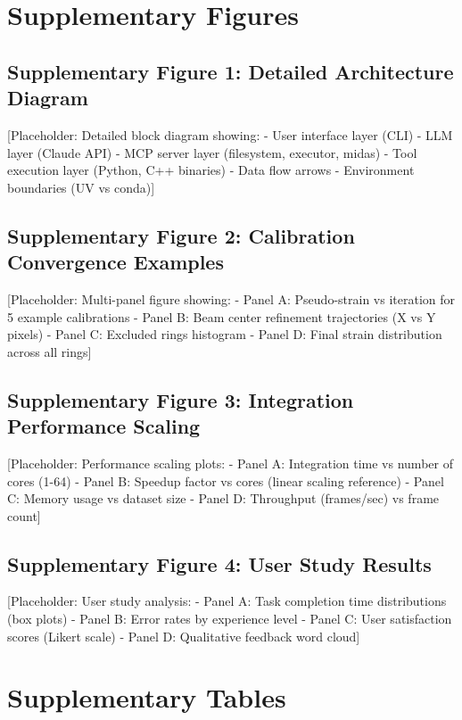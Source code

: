 \documentclass[11pt]{article}
\begin{document}
\section{Supplementary Figures}

\subsection{Supplementary Figure 1: Detailed Architecture Diagram}

[Placeholder: Detailed block diagram showing:
- User interface layer (CLI)
- LLM layer (Claude API)
- MCP server layer (filesystem, executor, midas)
- Tool execution layer (Python, C++ binaries)
- Data flow arrows
- Environment boundaries (UV vs conda)]

\subsection{Supplementary Figure 2: Calibration Convergence Examples}

[Placeholder: Multi-panel figure showing:
- Panel A: Pseudo-strain vs iteration for 5 example calibrations
- Panel B: Beam center refinement trajectories (X vs Y pixels)
- Panel C: Excluded rings histogram
- Panel D: Final strain distribution across all rings]

\subsection{Supplementary Figure 3: Integration Performance Scaling}

[Placeholder: Performance scaling plots:
- Panel A: Integration time vs number of cores (1-64)
- Panel B: Speedup factor vs cores (linear scaling reference)
- Panel C: Memory usage vs dataset size
- Panel D: Throughput (frames/sec) vs frame count]

\subsection{Supplementary Figure 4: User Study Results}

[Placeholder: User study analysis:
- Panel A: Task completion time distributions (box plots)
- Panel B: Error rates by experience level
- Panel C: User satisfaction scores (Likert scale)
- Panel D: Qualitative feedback word cloud]

\section{Supplementary Tables}
\end{document}
